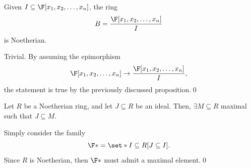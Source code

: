 \documentclass{subfiles}
\begin{document}
    \begin{corollary*}
        Given \(I \subseteq \F[x_{1}, x_{2}, \ldots, x_{n}]\), the ring 
        \[
            B = \frac{\F[x_{1}, x_{2}, \ldots, x_{n}]}{I}
        \]
        is Noetherian.
    \end{corollary*}

    \begin{proof*}
        Trivial. By assuming the epimorphism 
        \[
            \F[x_{1}, x_{2}, \ldots, x_{n}] \to \frac{\F[x_{1}, x_{2}, \ldots, x_{n}]}{I},
        \]
        the statement is true by the previously discussed proposition.\qed
    \end{proof*}

    \begin{proposition*}
        Let \(R\) be a Noetherian ring, and let \(J \subseteq R\) be an ideal.
            Then, \(\exists M \subseteq R\) maximal such that \(J \subseteq M\).
    \end{proposition*}

    \begin{proof*}
        Simply consider the family 
            \[
                \F* = \set*{I \subseteq R}[J \subseteq I].
            \]
            Since \(R\) is Noetherian, then \(\F*\) must admit a maximal element.\qed
    \end{proof*}
\end{document}
